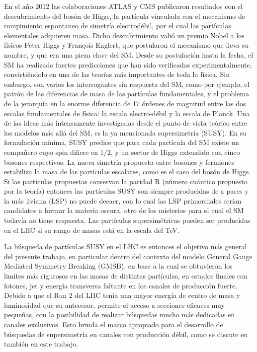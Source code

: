 En el año 2012 las colaboraciones ATLAS y CMS publicaron resultados con el descubrimiento del bosón de Higgs, la partícula vinculada con el mecanismo de rompimiento espontaneo de simetría electrodébil, por el cual las partículas elementales adquieren masa. Dicho descubrimiento valió un premio Nobel a los físicos Peter Higgs y François Englert, que postularon el mecanismo que lleva su nombre, y que era una pieza clave del SM. Desde su postulación hasta la fecha, el SM ha realizado fuertes predicciones que han sido verificadas experimentalmente, convirtiéndolo en una de las teorías más importantes de toda la física. Sin embargo, son varios los interrogantes sin respuesta del 
SM, como por ejemplo, el patrón de las diferencias de masa de las partículas fundamentales, y el problema de la jerarquía en la enorme diferencia de 17 órdenes de magnitud entre las dos escalas fundamentales de física: la escala electro-débil y la escala de Planck. Una de las ideas más intensamente investigadas desde el punto de vista teórico entre los modelos más allá del SM, es la ya mencionada supersimetría (SUSY). En su formulación mínima, SUSY predice que para cada partícula del SM existe un compañero cuyo spin difiere en $1/2$, y un sector de Higgs extendido con cinco bosones respectivos. La nueva simetría propuesta entre bosones y fermiones estabiliza la masa de las partículas escalares, como es el caso del bosón de Higgs. Si las partículas propuestas conservan la paridad R (número cuántico propuesto por la teoría) entonces las partículas SUSY son siempre producidas de a pares y la más liviana (LSP) no puede decaer, con lo cual las LSP primordiales serían candidatos a formar la materia oscura, otro de los misterios para el cual el SM todavía no tiene respuesta. Las partículas supersimétricas pueden ser producidas en el LHC si su rango de masas está en la escala del TeV. 

La búsqueda de partículas SUSY en el LHC es entonces el objetivo más general del presente trabajo, en particular dentro del contexto del modelo General Gauge Mediated Symmetry Breaking (GMSB), en base a la cual se obtuvieron los limites más rigurosos en las masas de distintas partículas, en estados finales con fotones, jet y energía transversa faltante en los canales de producción fuerte. Debido a que el Run 2 del LHC tenía una mayor energía de centro de masa y luminosidad que su antecesor, permite el acceso a secciones eficaces muy pequeñas, con la posibilidad de realizar búsquedas mucho más dedicadas en canales exclusivos. Esto brinda el marco apropiado para el desarrollo de búsquedas de supersimetría en canales con producción débil, como se discute en también en este trabajo. 

